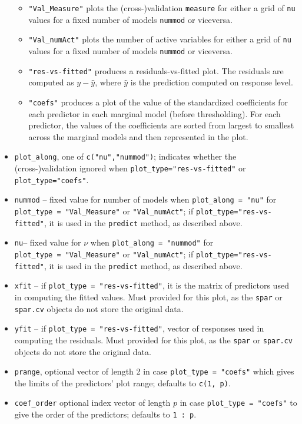 \documentclass[
  article]{jss}
\begin{document}
\begin{itemize}
  \begin{itemize}
  \item
    \texttt{"Val\_Measure"} plots the (cross-)validation
    \texttt{measure} for either a grid of \texttt{nu} values for a fixed
    number of models \texttt{nummod} or viceversa.
  \item
    \texttt{"Val\_numAct"} plots the number of active variables for
    either a grid of \texttt{nu} values for a fixed number of models
    \texttt{nummod} or viceversa.
  \item
    \texttt{"res-vs-fitted"} produces a residuals-vs-fitted plot. The
    residuals are computed as \(y- \widehat y\), where \(\widehat y\) is
    the prediction computed on response level.
  \item
    \texttt{"coefs"} produces a plot of the value of the standardized
    coefficients for each predictor in each marginal model (before
    thresholding). For each predictor, the values of the coefficients
    are sorted from largest to smallest across the marginal models and
    then represented in the plot.
  \end{itemize}
\item
  \texttt{plot\_along}, one of \texttt{c("nu","nummod")}; indicates
  whether the (cross-)validation ignored when
  \texttt{plot\_type="res-vs-fitted"} or \texttt{plot\_type="coefs"}.
\item
  \texttt{nummod} -- fixed value for number of models when
  \texttt{plot\_along\ =\ "nu"} for
  \texttt{plot\_type\ =\ "Val\_Measure"} or \texttt{"Val\_numAct"}; if
  \texttt{plot\_type="res-vs-fitted"}, it is used in the
  \texttt{predict} method, as described above.
\item
  \texttt{nu}-- fixed value for \(\nu\) when
  \texttt{plot\_along\ =\ "nummod"} for
  \texttt{plot\_type\ =\ "Val\_Measure"} or \texttt{"Val\_numAct"}; if
  \texttt{plot\_type="res-vs-fitted"}, it is used in the
  \texttt{predict} method, as described above.
\item
  \texttt{xfit} -- if \texttt{plot\_type\ =\ "res-vs-fitted"}, it is the
  matrix of predictors used in computing the fitted values. Must
  provided for this plot, as the \texttt{spar} or \texttt{spar.cv}
  objects do not store the original data.
\item
  \texttt{yfit} -- if \texttt{plot\_type\ =\ "res-vs-fitted"}, vector of
  responses used in computing the residuals. Must provided for this
  plot, as the \texttt{spar} or \texttt{spar.cv} objects do not store
  the original data.
\item
  \texttt{prange}, optional vector of length 2 in case
  \texttt{plot\_type\ =\ "coefs"} which gives the limits of the
  predictors' plot range; defaults to \texttt{c(1,\ p)}.
\item
  \texttt{coef\_order} optional index vector of length \(p\) in case
  \texttt{plot\_type\ =\ "coefs"} to give the order of the predictors;
  defaults to \texttt{1\ :\ p}.
\end{itemize}
\end{document}
